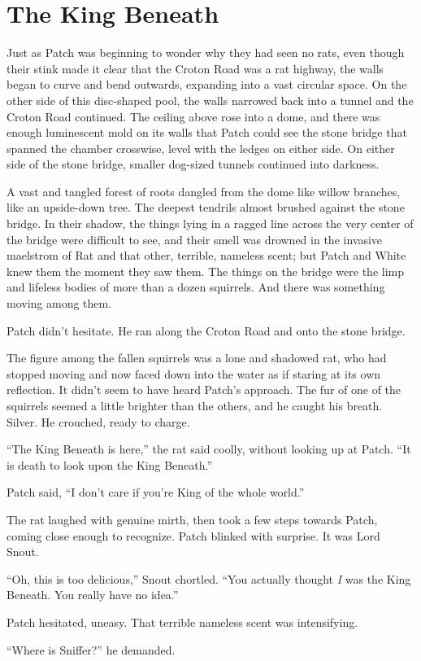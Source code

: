 \documentclass[ebook,oneside,openany,17pt]{memoir}
\renewcommand{\thechapter}{\Roman{chapter}}
\newcounter{sections}
\newcommand{\sections}[1]{%
  \section*{#1}
  \addtocounter{sections}{1}%
  \pdfbookmark[1]{#1}{section.\thechapter.\thesections}}
\begin{document}

\sections{The King Beneath}

Just as Patch was beginning to wonder why they had seen no rats, even
though their stink made it clear that the Croton Road was a rat
highway, the walls began to curve and bend outwards, expanding into a
vast circular space. On the other side of this disc-shaped pool, the
walls narrowed back into a tunnel and the Croton Road continued. The
ceiling above rose into a dome, and there was enough luminescent mold
on its walls that Patch could see the stone bridge that spanned the
chamber crosswise, level with the ledges on either side. On either
side of the stone bridge, smaller dog-sized tunnels continued into
darkness.

A vast and tangled forest of roots dangled from the dome like willow
branches, like an upside-down tree. The deepest tendrils almost
brushed against the stone bridge. In their shadow, the things lying in
a ragged line across the very center of the bridge were difficult to
see, and their smell was drowned in the invasive maelstrom of Rat and
that other, terrible, nameless scent; but Patch and White knew them
the moment they saw them. The things on the bridge were the limp and
lifeless bodies of more than a dozen squirrels. And there was
something moving among them.

Patch didn’t hesitate. He ran along the Croton Road and onto the stone
bridge.

The figure among the fallen squirrels was a lone and shadowed rat, who
had stopped moving and now faced down into the water as if staring at
its own reflection. It didn’t seem to have heard Patch’s approach. The
fur of one of the squirrels seemed a little brighter than the others,
and he caught his breath. Silver. He crouched, ready to charge.

“The King Beneath is here,” the rat said coolly, without looking up at
Patch. “It is death to look upon the King Beneath.”

Patch said, “I don’t care if you’re King of the whole world.”

The rat laughed with genuine mirth, then took a few steps towards
Patch, coming close enough to recognize. Patch blinked with
surprise. It was Lord Snout.

“Oh, this is too delicious,” Snout chortled. “You actually thought
\emph{I} was the King Beneath. You really have no idea.”

Patch hesitated, uneasy. That terrible nameless scent was
intensifying.

“Where is Sniffer?” he demanded.
\end{document}
